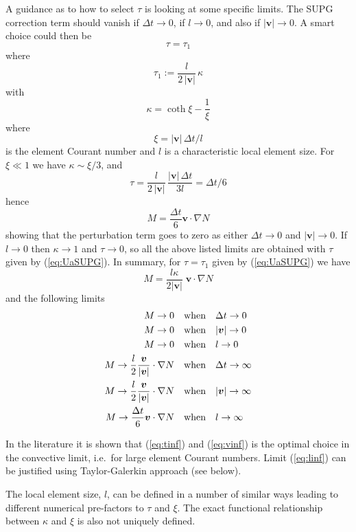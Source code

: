 \documentclass[10pt,a4paper]{book}
\begin{document}
A guidance as to how to select $\tau$ is looking at some specific
limits.  The SUPG correction term should vanish if $\Delta t \to 0$,
if $l\to 0$, and also if $|\bm{v}| \to 0$. A smart choice could then be
\[
\tau=\tau_1
\]
where
\begin{equation}
\tau_1 := \frac{l}{2 \, |\bm{v}|} \, \kappa 
\label{eq:UaSUPG}
\end{equation}
with 
\begin{equation}
\kappa=  \coth \xi - \frac{1}{\xi} 
\label{eq:kappa}
\end{equation}
where
\[
\xi=|\bm{v}| \, \Delta t/l
\]
is the element Courant number and $l$ is a characteristic local
element size.  For $\xi \ll 1$ we have $\kappa \sim \xi/3$, and
\[
\tau=\frac{l}{2 \, |\bm{v}|} \, \frac{| \bm{v} | \, \Delta t}{3 l} 
=\Delta t/6 
\]
hence
\[
M=\frac{\Delta t}{6} \bm{v} \cdot \nabla N
\]
showing that the perturbation term goes to zero as either
$\Delta t \to 0$ and $|\bm{v}| \to 0$. If $l \to 0$ then $\kappa \to 1$
and $\tau \to 0$, so all the above listed limits are obtained with
$\tau$ given by (\ref{eq:UaSUPG}). In summary, for $\tau=\tau_1$ given by (\ref{eq:UaSUPG}) we have
\[
M=\frac{l \kappa}{2 |\bm{v}|} \; \bm{v} \cdot \nabla N
\]
and the following limits
\begin{align}
M \to 0 &\quad \hbox{when} \quad \Delta t \to 0 \nonumber \\
M \to 0 &\quad \hbox{when} \quad  |\bm{v}| \to 0 \nonumber \\
M \to 0 &\quad \hbox{when} \quad  l \to 0 \nonumber \\
M \to \frac{l}{2} \frac{\bm{v}}{|\bm{v}|} \cdot \nabla N  &\quad \hbox{when} \quad \Delta t \to \infty \label{eq:tinf}\\
M \to \frac{l}{2} \frac{\bm{v}}{|\bm{v}|} \cdot \nabla N  &\quad \hbox{when} \quad |\bm{v}| \to \infty \label{eq:vinf} \\
M \to \frac{\Delta t}{6} \bm{v} \cdot \nabla N &\quad \hbox{when} \quad l \to \infty \label{eq:linf}
\end{align}

In the literature it is shown that (\ref{eq:tinf}) and (\ref{eq:vinf})
is the optimal choice in the convective limit, i.e.\ for large element
Courant numbers. Limit (\ref{eq:linf}) can be justified using
Taylor-Galerkin approach (see below).

The local element size, $l$, can be defined in a number of similar
ways leading to different numerical pre-factors to $\tau$ and
$\xi$. The exact functional relationship between $\kappa$ and $\xi$ is
also not uniquely defined.
\end{document}
